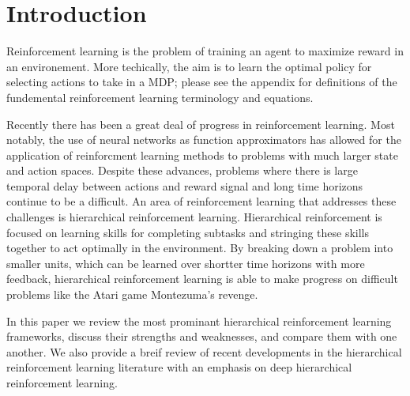 \section{Introduction}
Reinforcement learning is the problem of training an agent to maximize reward in an environement.
More techically, the aim is to learn the optimal policy for selecting actions to take in a MDP;
please see the appendix for definitions of the fundemental reinforcement learning terminology
and equations.

Recently there has been a great deal of progress in reinforcement learning. Most notably,
the use of neural networks as function approximators has allowed for the application of
reinforcment learning methods to problems with much larger state and action spaces.
Despite these advances, problems where there is large temporal delay between actions and reward signal
and long time horizons continue to be a difficult.
An area of reinforcement learning that addresses these challenges is hierarchical reinforcement learning.
Hierarchical reinforcement is focused on learning skills for completing subtasks and stringing these skills
together to act optimally in the environment. By breaking down a problem into smaller units, which can be learned
over shortter time horizons with more feedback, hierarchical reinforcement learning is able to make progress on difficult
problems like the Atari game Montezuma's revenge.

In this paper we review the most prominant hierarchical reinforcement learning frameworks, discuss their strengths and
weaknesses, and compare them with one another. We also provide a breif review of recent developments in the
hierarchical reinforcement learning literature with an emphasis on deep hierarchical reinforcement learning.

